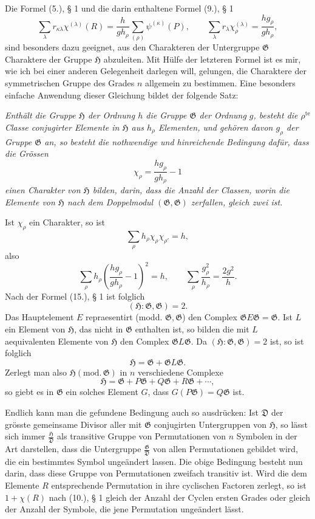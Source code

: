 \documentclass[11pt]{article}
\newcommand{\Hgr}{\mathfrak{H}}
\newcommand{\Ggr}{\mathfrak{G}}
\newcommand{\Dgr}{\mathfrak{D}}
\begin{document}
Die Formel (5.), § 1 und die darin enthaltene Formel (9.), § 1
\[
\tag{1.}
  \sum_\lambda r_{\kappa\lambda}\chi^{(\lambda)}(R)
  =
  \frac{h}{g h_\rho}\sum_{(\rho)}\psi^{(\kappa)}(P),
  \qquad
  \sum_\lambda r_\lambda\chi_\rho^{(\lambda)}
  =
  \frac{h g_\rho}{g h_\rho},
\]
sind besonders dazu geeignet, aus den Charakteren der Untergruppe $\Ggr$ Charaktere der Gruppe $\Hgr$ abzuleiten. Mit Hülfe der letzteren Formel ist es mir, wie ich bei einer anderen Gelegenheit darlegen will, gelungen, die Charaktere der symmetrischen Gruppe des Grades $n$ allgemein zu bestimmen. Eine besonders einfache Anwendung dieser Gleichung bildet der folgende Satz:

\emph{Enthält die Gruppe $\Hgr$ der Ordnung $h$ die Gruppe $\Ggr$ der Ordnung $g$, besteht die $\rho^{\mathrm{te}}$ Classe conjugirter Elemente in $\Hgr$ aus $h_\rho$ Elementen, und gehören davon $g_\rho$ der Gruppe $\Ggr$ an, so besteht die nothwendige und hinreichende Bedingung dafür, dass die Grössen}
\[
\tag{1.}
  \chi_\rho=\frac{h g_\rho}{g h_\rho}-1
\]
\emph{einen Charakter von $\Hgr$ bilden, darin, dass die Anzahl der Classen, worin die Elemente von $\Hgr$ nach dem Doppelmodul $(\Ggr,\Ggr)$ zerfallen, gleich zwei ist.}

Ist $\chi_\rho$ ein Charakter, so ist
\[
\tag{2.}
  \sum_\rho h_\rho\chi_\rho\chi_{\rho'}=h,
\]
also
\[
  \sum_\rho h_\rho\left(\frac{h g_\rho}{g h_\rho}-1\right)^2=h,
  \qquad
  \sum_\rho\frac{g_\rho^2}{h_\rho}=\frac{2g^2}{h}.
\]
Nach der Formel (15.), § 1 ist folglich
\[
\tag{3.}
  (\Hgr:\Ggr,\Ggr)=2.
\]
Das Hauptelement $E$ repraesentirt (modd. $\Ggr,\Ggr$) den Complex $\Ggr E\Ggr=\Ggr$. Ist $L$ ein Element von $\Hgr$, das nicht in $\Ggr$ enthalten ist, so bilden die mit $L$ aequivalenten Elemente von $\Hgr$ den Complex $\Ggr L\Ggr$. Da $(\Hgr:\Ggr,\Ggr)=2$ ist, so ist folglich
\[
\tag{4.}
  \Hgr=\Ggr+\Ggr L\Ggr.
\]
Zerlegt man also $\Hgr(\mathrm{mod.}\,\Ggr)$ in $n$ verschiedene Complexe
\[
  \Hgr=\Ggr+P\Ggr+Q\Ggr+R\Ggr+\cdots,
\]
so giebt es in $\Ggr$ ein solches Element $G$, dass $G(P\Ggr)=Q\Ggr$ ist.

Endlich kann man die gefundene Bedingung auch so ausdrücken: Ist $\Dgr$ der grösste gemeinsame Divisor aller mit $\Ggr$ conjugirten Untergruppen von $\Hgr$, so lässt sich immer $\frac{\Hgr}{\Dgr}$ als transitive Gruppe von Permutationen von $n$ Symbolen in der Art darstellen, dass die Untergruppe $\frac{\Ggr}{\Dgr}$ von allen Permutationen gebildet wird, die ein bestimmtes Symbol ungeändert lassen. Die obige Bedingung besteht nun darin, dass diese Gruppe von Permutationen zweifach transitiv ist. Wird die dem Elemente $R$ entsprechende Permutation in ihre cyclischen Factoren zerlegt, so ist $1+\chi(R)$ nach (10.), § 1 gleich der Anzahl der Cyclen ersten Grades oder gleich der Anzahl der Symbole, die jene Permutation ungeändert lässt.
\end{document}
